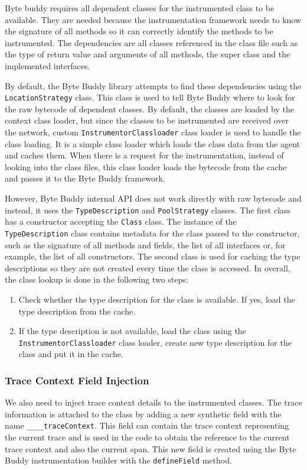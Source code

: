 Byte buddy requires all dependent classes for the instrumented class to be available. They are needed because the instrumentation framework needs to know the signature of all methods so it can correctly identify the methods to be instrumented. The dependencies are all classes referenced in the class file such as the type of return value and arguments of all methods, the super class and the implemented interfaces. 

By default, the Byte Buddy library attempts to find these dependencies using  the \texttt{LocationStrategy} class. This class is used to tell Byte Buddy where to look for the raw bytecode of dependent classes. By default, the classes are loaded by the context class loader, but since the classes to be instrumented are received over the network, custom \texttt{InstrumentorClassloader} class loader is used to handle the class loading. It is a simple class loader which loads the class data from the agent and caches them. When there is a request for the instrumentation, instead of looking into the class files, this class loader loads the bytecode from the cache and passes it to the Byte Buddy framework.

However, Byte Buddy internal API does not work directly with raw bytecode and instead, it uses the \texttt{TypeDescription} and \texttt{PoolStrategy} classes. The first class has a constructor accepting the \texttt{Class} class. The instance of the \texttt{TypeDescription} class contains metadata for the class passed to the constructor, such as the signature of all methods and fields, the list of all interfaces or, for example, the list of all constructors. The second class is used for caching the type descriptions so they are not created every time the class is accessed. In overall, the class lookup is done in the following two steps:
\begin{enumerate}
	\item Check whether the type description for the class is available. If yes, load the type description from the cache.
	\item If the type description is not available, load the class using the \linebreak \texttt{InstrumentorClassloader} class loader, create new type description for the class and put it in the cache.
\end{enumerate}

\subsubsection{Trace Context Field Injection}
We also need to inject trace context details to the instrumented classes. The trace information is attached to the class by adding a new synthetic field with the name \texttt{\_\_\_\_traceContext}. This field can contain the trace context representing the current trace and is used in the code to obtain the reference to the current trace context and also the current span. This new field is created using the Byte Buddy instrumentation builder with the \texttt{defineField} method.

